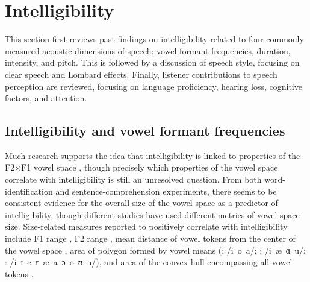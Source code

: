 
\section{Intelligibility}
This section first reviews past findings on intelligibility related to four commonly measured acoustic dimensions of speech: vowel formant frequencies, duration, intensity, and pitch.  %
This is followed by a discussion of speech style, focusing on clear speech and Lombard effects.  Finally, listener contributions to speech perception are reviewed, focusing on language proficiency, hearing loss, cognitive factors, and attention.

\subsection{Intelligibility and vowel formant frequencies\label{sec:IntelVowel}}
Much research supports the idea that intelligibility is linked to properties of the F2×F1 vowel space \citep[\eg][]{BondMoore1994, BradlowEtAl1996, HazanMarkham2004, Neel2008, McCloyEtAl2013}, though precisely which properties of the vowel space correlate with intelligibility is still an unresolved question.  From both word-identification and sentence-comprehension experiments, there seems to be consistent evidence for the overall size of the vowel space as a predictor of intelligibility, though different studies have used different metrics of vowel space size.  Size-related measures reported to positively correlate with intelligibility include F1 range \citep{BradlowEtAl1996}, F2 range \citep{HazanMarkham2004}, mean distance of vowel tokens from the center of the vowel space \citep{BradlowEtAl1996, McCloyEtAl2013}, area of polygon formed by vowel means (\citealt{BradlowEtAl1996}: /i~o~a/; \citealt{Neel2008}: /i~æ~ɑ~u/;  \citealt{McCloyEtAl2012}: /i~ɪ~e~ɛ~æ~a~ɔ~o~ʊ~u/), and area of the convex hull encompassing all vowel tokens \citep{McCloyEtAl2013}.

